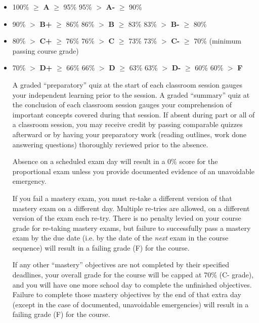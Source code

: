 \begin{itemize}
\item{} 100\% $\geq$ {\bf A} $\geq$ 95\% \hskip 33pt 95\% $>$ {\bf A-} $\geq$ 90\%
\item{} 90\% $>$ {\bf B+} $\geq$ 86\% \hskip 30pt 86\% $>$ {\bf B} $\geq$ 83\% \hskip 30pt 83\% $>$ {\bf B-} $\geq$ 80\%
\item{} 80\% $>$ {\bf C+} $\geq$ 76\% \hskip 30pt 76\% $>$ {\bf C} $\geq$ 73\% \hskip 30pt 73\% $>$ {\bf C-} $\geq$ 70\% (minimum passing course grade)
\item{} 70\% $>$ {\bf D+} $\geq$ 66\% \hskip 30pt 66\% $>$ {\bf D} $\geq$ 63\% \hskip 30pt 63\% $>$ {\bf D-} $\geq$ 60\% \hskip 30pt 60\% $>$ {\bf F}
\medskip

\vskip 10pt

A graded ``preparatory'' quiz at the start of each classroom session gauges your independent learning prior to the session.  A graded ``summary'' quiz at the conclusion of each classroom session gauges your comprehension of important concepts covered during that session.  If absent during part or all of a classroom session, you may receive credit by passing comparable quizzes afterward or by having your preparatory work (reading outlines, work done answering questions) thoroughly reviewed prior to the absence.  

\vskip 10pt

Absence on a scheduled exam day will result in a 0\% score for the proportional exam unless you provide documented evidence of an unavoidable emergency.  

\vskip 10pt

If you fail a mastery exam, you must re-take a different version of that mastery exam on a different day.  Multiple re-tries are allowed, on a different version of the exam each re-try.  There is no penalty levied on your course grade for re-taking mastery exams, but failure to successfully pass a mastery exam by the due date (i.e. by the date of the {\it next} exam in the course sequence) will result in a failing grade (F) for the course.  

\vskip 10pt

If any other ``mastery'' objectives are not completed by their specified deadlines, your overall grade for the course will be capped at 70\% (C- grade), and you will have one more school day to complete the unfinished objectives.  Failure to complete those mastery objectives by the end of that extra day (except in the case of documented, unavoidable emergencies) will result in a failing grade (F) for the course.


\end{itemize}
